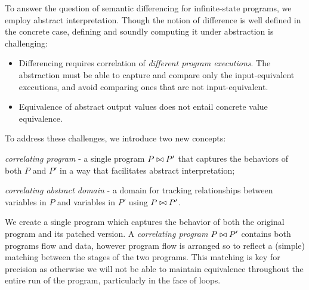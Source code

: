To answer the question of semantic differencing for infinite-state programs, we employ abstract interpretation. Though the notion of difference is well defined in the concrete case, defining and soundly computing it under abstraction is challenging:
\begin{itemize}
\item Differencing requires correlation of \emph{different program executions}. The abstraction must be able to capture and compare only the input-equivalent executions, and avoid comparing ones that are not input-equivalent.
\item Equivalence of abstract output values does not entail concrete value equivalence.
\end{itemize}

To address these challenges, we introduce two new concepts:
\begin{inparaenum}[(i)]
\item \emph{correlating program} - a single program $P \bowtie P'$ that captures the behaviors of both $P$ and $P'$ in a way that facilitates abstract interpretation;
\item \emph{correlating abstract domain} - a domain for tracking relationships between variables in $P$ and variables in $P'$ using $P \bowtie P'$.
\end{inparaenum}

We create a single program which captures the behavior of both the original program and its patched version. A \emph{correlating program} $P \bowtie P'$ contains both programs flow and data, however program flow is arranged so to reflect a (simple) matching between the stages of the two programs. This matching is key for precision as otherwise we will not be able to maintain equivalence throughout the entire run of the program, particularly in the face of loops.


